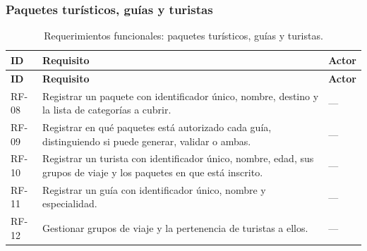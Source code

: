 \documentclass[11pt,a4paper]{article}
\begin{document}
\subsubsection{Paquetes turísticos, guías y turistas}
{\footnotesize\setlength{\tabcolsep}{3pt}\renewcommand{\arraystretch}{1.15}
\begin{longtable}{|>{\raggedright\arraybackslash}p{1.28cm}|>{\raggedright\arraybackslash}p{11.28cm}|>{\raggedright\arraybackslash}p{2.98cm}|}
\caption{Requerimientos funcionales: paquetes turísticos, guías y turistas.}\label{tab:rf-paquetes}\\ \hline
\rowcolor{gray!20} \textbf{ID} & \textbf{Requisito} & \textbf{Actor} \\ \hline
\endfirsthead
\hline \rowcolor{gray!20} \textbf{ID} & \textbf{Requisito} & \textbf{Actor} \\ \hline
\endhead
RF-08 & Registrar un paquete con identificador único, nombre, destino y la lista de categorías a cubrir. & — \\ \hline
RF-09 & Registrar en qué paquetes está autorizado cada guía, distinguiendo si puede generar, validar o ambas. & — \\ \hline
RF-10 & Registrar un turista con identificador único, nombre, edad, sus grupos de viaje y los paquetes en que está inscrito. & — \\ \hline
RF-11 & Registrar un guía con identificador único, nombre y especialidad. & — \\ \hline
RF-12 & Gestionar grupos de viaje y la pertenencia de turistas a ellos. & — \\ \hline
\end{longtable}}
\vspace{2pt}
\end{document}
